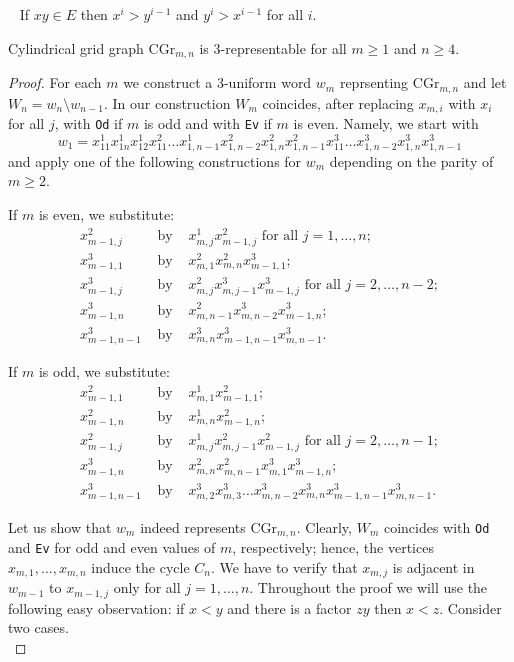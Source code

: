 \documentclass[10pt,a4paper]{amsart}
\begin{document}
\begin{Fact}~\label{evident}
If $xy\in E$ then $x^i>y^{i-1}$ and $y^i>x^{i-1}$ for all $i$.
\end{Fact}

\begin{theorem}\label{cyl4}  Cylindrical grid graph $\mbox{CGr}_{m,n}$ is $3$-representable for all $m\geq 1$ and $n\ge 4$.\end{theorem}

\begin{proof}
For each $m$ we construct a 3-uniform word $w_m$ reprsenting $\mbox{CGr}_{m,n}$ and let $W_n=w_n\setminus w_{n-1}$. In our construction $W_m$ coincides, after replacing $x_{m,i}$ with  $x_i$ for all $j$, with \texttt{Od} if $m$ is odd and with \texttt{Ev} if $m$ is even. Namely, we start with
$$w_1=x_{11}^1x_{1n}^1x_{12}^1x_{11}^2\ldots x_{1,n-1}^1x_{1,n-2}^2x_{1,n}^2x_{1,n-1}^2x_{11}^3\ldots x_{1,n-2}^3x_{1,n}^3x_{1,n-1}^3$$
and apply one of the following constructions for $w_m$ depending on the parity of $m\ge 2$. 

If $m$ is even, we substitute:
\begin{eqnarray*}
x_{m-1,j}^2 & \mbox{ by } & x_{m,j}^1x_{m-1,j}^2  \mbox{ for all } j=1,\ldots,n;\\
x_{m-1,1}^3 & \mbox{ by } & x_{m,1}^2x_{m,n}^2x_{m-1,1}^3; \\
x_{m-1,j}^3 & \mbox{ by } & x_{m,j}^2x_{m,j-1}^3x_{m-1,j}^3 \mbox{ for all } j=2,\ldots,n-2;\\
x_{m-1,n}^3 & \mbox{ by } & x_{m,n-1}^2x_{m,n-2}^3x_{m-1,n}^3;\\
x_{m-1,n-1}^3 & \mbox{ by } & x_{m,n}^3x_{m-1,n-1}^3x_{m,n-1}^3.
\end{eqnarray*}

If $m$ is odd, we substitute:
\begin{eqnarray*}
x_{m-1,1}^2 & \mbox{ by } & x_{m,1}^1x_{m-1,1}^2;\\
x_{m-1,n}^2 & \mbox{ by } & x_{m,n}^1x_{m-1,n}^2 ;\\
x_{m-1,j}^2 & \mbox{ by } & x_{m,j}^1x_{m,j-1}^2x_{m-1,j}^2 \mbox{ for all } j=2,\ldots,n-1;\\
x_{m-1,n}^3 & \mbox{ by } & x_{m,n}^2x_{m,n-1}^2x_{m,1}^3x_{m-1,n}^3;\\
x_{m-1,n-1}^3 & \mbox{ by } & x_{m,2}^3x_{m,3}^3\ldots x_{m,n-2}^3x_{m,n}^3x_{m-1,n-1}^3x_{m,n-1}^3.
\end{eqnarray*}

Let us show that $w_m$ indeed represents $\mathrm{CGr}_{m,n}$. Clearly, $W_m$ coincides with \texttt{Od} and \texttt{Ev} for odd and even values of $m$, respectively; hence, the vertices $x_{m,1}, \ldots, x_{m,n}$ induce the cycle $C_n$. We have to verify that $x_{m,j}$ is adjacent in $w_{m-1}$ to  $x_{m-1,j}$ only for all $ j=1,\ldots,n$. 
Throughout the proof we will use the following easy observation: if $x<y$ and there is a factor $zy$ then $x<z$.
Consider two cases. \\[-3mm]


\end{proof}
\end{document}
